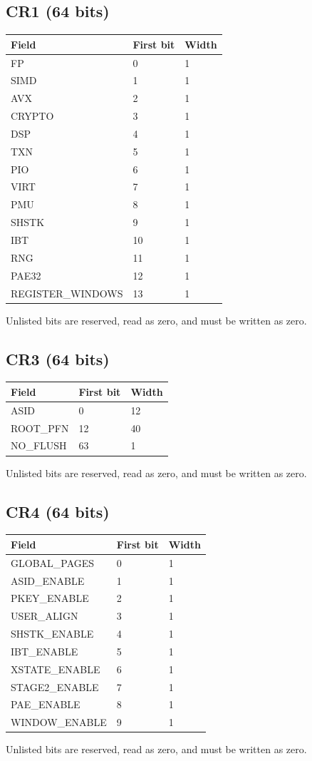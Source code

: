 \documentclass[10pt]{article}
\begin{document}
\subsection{CR1 (64 bits)}
\begin{longtable}{@{}L{4.5cm}L{2cm}L{2cm}@{}}
\toprule Field & First bit & Width \\ \midrule
FP & 0 & 1 \\
SIMD & 1 & 1 \\
AVX & 2 & 1 \\
CRYPTO & 3 & 1 \\
DSP & 4 & 1 \\
TXN & 5 & 1 \\
PIO & 6 & 1 \\
VIRT & 7 & 1 \\
PMU & 8 & 1 \\
SHSTK & 9 & 1 \\
IBT & 10 & 1 \\
RNG & 11 & 1 \\
PAE32 & 12 & 1 \\
REGISTER\_\allowbreak{}WINDOWS & 13 & 1 \\
\bottomrule\end{longtable}
Unlisted bits are reserved, read as zero, and must be written as zero.
\subsection{CR3 (64 bits)}
\begin{longtable}{@{}L{4.5cm}L{2cm}L{2cm}@{}}
\toprule Field & First bit & Width \\ \midrule
ASID & 0 & 12 \\
ROOT\_\allowbreak{}PFN & 12 & 40 \\
NO\_\allowbreak{}FLUSH & 63 & 1 \\
\bottomrule\end{longtable}
Unlisted bits are reserved, read as zero, and must be written as zero.
\subsection{CR4 (64 bits)}
\begin{longtable}{@{}L{4.5cm}L{2cm}L{2cm}@{}}
\toprule Field & First bit & Width \\ \midrule
GLOBAL\_\allowbreak{}PAGES & 0 & 1 \\
ASID\_\allowbreak{}ENABLE & 1 & 1 \\
PKEY\_\allowbreak{}ENABLE & 2 & 1 \\
USER\_\allowbreak{}ALIGN & 3 & 1 \\
SHSTK\_\allowbreak{}ENABLE & 4 & 1 \\
IBT\_\allowbreak{}ENABLE & 5 & 1 \\
XSTATE\_\allowbreak{}ENABLE & 6 & 1 \\
STAGE2\_\allowbreak{}ENABLE & 7 & 1 \\
PAE\_\allowbreak{}ENABLE & 8 & 1 \\
WINDOW\_\allowbreak{}ENABLE & 9 & 1 \\
\bottomrule\end{longtable}
Unlisted bits are reserved, read as zero, and must be written as zero.
\end{document}
